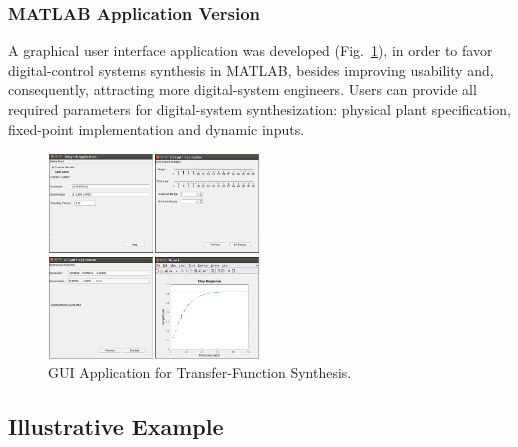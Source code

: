 \documentclass[sigconf]{acmart}
\begin{document}
\subsubsection{MATLAB Application Version} 

A graphical user interface application was developed (Fig.~\ref{fig:gui-for-tf}), in order to favor digital-control systems synthesis in MATLAB, besides improving usability and, consequently, attracting more digital-system engineers. Users can provide all required parameters for digital-system synthesization: physical plant specification, fixed-point implementation and dynamic inputs. 
%
\begin{figure}
  \includegraphics[width=0.5\textwidth]{screens_dssynth.png}
  \caption{GUI Application for Transfer-Function Synthesis.}
  \label{fig:gui-for-tf}
\end{figure}


\subsection{Illustrative Example}
\end{document}
